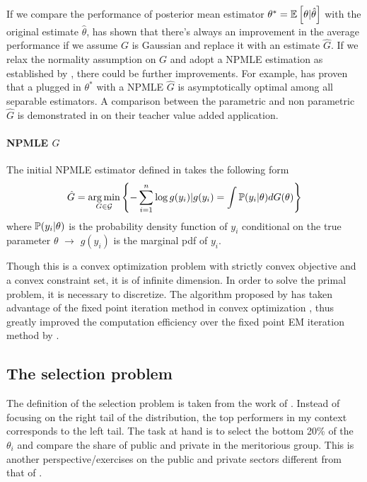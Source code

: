 \documentclass[12pt]{article}
\begin{document}
If we compare the performance of posterior mean estimator
$\theta^*=\mathbb{E}\left[\theta|\hat{\theta}\right]$ with the original estimate
$\hat{\theta}$, \citet{james1992estimation} has shown that there's always an
improvement in the average performance if we assume $G$ is Gaussian and replace
it with an estimate $\hat{G}$. If we relax the normality assumption on $G$ and
adopt a NPMLE estimation as established by \citet{kiefer1956consistency}, there
could be further improvements. For example, \citet{jiang2009general} has proven
that a plugged in $\theta^*$ with a NPMLE $\hat{G}$ is asymptotically optimal
among all separable estimators. A comparison between the parametric and non
parametric $\hat{G}$ is demonstrated in \citet{gilraine2020new} on their
teacher value added application.

\paragraph{NPMLE $G$}

The initial NPMLE estimator defined in \citet{kiefer1956consistency} takes the
following form
\begin{equation*}
    \hat{G}=\operatorname*{arg\,min}_{G\in \mathcal{G}} \left\{-\sum_{i=1}^{n}\log g(y_i)|g(y_i)=\int  \mathbb{P}(y_i |\theta)dG(\theta) \right\}
\end{equation*}
where $\mathbb{P}(y_i |\theta)$ is the probability density function of $y_i$ conditional on the true parameter $\theta$ $\longrightarrow$ $g(y_i)$ is the marginal pdf of $y_i$.

Though this is a convex optimization problem with strictly convex objective and
a convex constraint set, it is of infinite dimension. In order to solve the
primal problem, it is necessary to discretize. The algorithm proposed by
\citet{koenker2014convex} has taken advantage of the fixed point iteration
method in convex optimization \citep{andersen2010mosek}, thus greatly improved
the computation efficiency over the fixed point EM iteration method by
\citet{jiang2009general}.

\subsection{The selection problem}
The definition of the selection problem is taken from the work of
\citet{gu2023invidious}. Instead of focusing on the right tail of the
distribution, the top performers in my context corresponds to the left tail.
The task at hand is to select the bottom 20\% of the $\theta_i$ and compare the
share of public and private in the meritorious group. This is another
perspective/exercises on the public and private sectors different from that of
\citet{croiset2024hospitals}.
\end{document}
